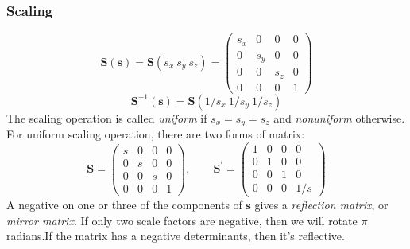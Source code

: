 \documentclass[10pt, a4paper]{article}
\begin{document}
            \subsubsection{Scaling}
            \begin{equation*}
                \textbf{S}(\textbf{s}) = \textbf{S}(s_x\ s_y\ s_z) =
                \begin{pmatrix}
                    s_x & 0 & 0 & 0\\
                    0 & s_y & 0 & 0\\
                    0 & 0 & s_z & 0\\
                    0 & 0 & 0 & 1
                \end{pmatrix}
            \end{equation*}
            $$\textbf{S}^{-1}(\textbf{s}) = \textbf{S}(1/s_x\ 1/s_y\ 1/s_z)$$
            \indent The scaling operation is called \emph{uniform} if $s_x = s_y = s_z$ and \emph{nonuniform} otherwise.\\
            \newpage
            For uniform scaling operation, there are two forms of matrix:
            \begin{equation*}
                \textbf{S} = 
                \begin{pmatrix}
                    s & 0 & 0 & 0\\
                    0 & s & 0 & 0\\
                    0 & 0 & s & 0\\
                    0 & 0 & 0 & 1
                \end{pmatrix}
                ,\quad\quad
                \textbf{S}^{'} = 
                \begin{pmatrix}
                    1 & 0 & 0 & 0\\
                    0 & 1 & 0 & 0\\
                    0 & 0 & 1 & 0\\
                    0 & 0 & 0 & 1/s
                \end{pmatrix}
            \end{equation*}
            \indent A negative on one or three of the components of $\textbf{s}$ gives a \emph{reflection matrix}, or \emph{mirror matrix}. If only two scale factors are negative, then we will rotate $\pi$ radians.If the matrix has a negative determinants, then it's reflective.
\end{document}
